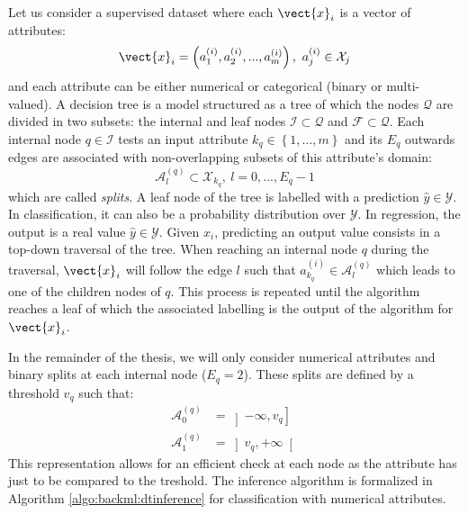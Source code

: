 Let us consider a supervised dataset where each $\vect{x}_i$ is a vector of
attributes:
\begin{equation}
\label{eqn:backml:dt:vectattributes}
\vect{x}_i = \left(a^{(i)}_1, a^{(i)}_2, ..., a^{(i)}_m\right),~a^{(i)}_j \in \mathcal{X}_j
\end{equation}
and each attribute can be either numerical or categorical (binary or multi-valued).
A decision tree is a model structured as a tree of which the nodes $\mathcal{Q}$
are divided in two subsets: the internal and leaf nodes $\mathcal{I} \subset \mathcal{Q}$
and $\mathcal{F} \subset \mathcal{Q}$. Each internal node $q \in \mathcal{I}$
tests an input attribute $k_q \in \left\{1,...,m\right\}$ and its $E_q$ outwards
edges are associated with non-overlapping subsets of this attribute's domain:
\begin{equation}
\label{eqn:backml:dt:splitsgeneric}
\mathcal{A}^{(q)}_l \subset \mathcal{X}_{k_q},~l = 0,...,E_q-1
\end{equation}
which are called \textit{splits}. A leaf node of the tree is labelled with
a prediction $\hat{y} \in \mathcal{Y}$. In classification, it can also be a probability distribution over $\mathcal{Y}$.
In regression, the output is a real value $\hat{y} \in \mathcal{Y}$. Given $x_i$,
predicting an output value consists in a top-down traversal of the tree. When
reaching an internal node $q$ during the traversal, $\vect{x}_i$ will follow the
edge $l$ such that $a^{(i)}_{k_q} \in \mathcal{A}^{(q)}_l$ which leads to one of
the children nodes of $q$. This process is repeated until the algorithm reaches
a leaf of which the associated labelling is the output of the algorithm for
$\vect{x}_i$.

In the remainder of the thesis, we will only consider numerical attributes and
binary splits at each internal node ($E_q = 2$). These splits are defined by a
threshold $v_q$ such that:
\begin{align}
\label{eqn:backml:dt:splitsbinary}
\mathcal{A}^{(q)}_0 &= \left]-\infty, v_q\right]\\
\mathcal{A}^{(q)}_1 &= \left]v_q, +\infty\right[
\end{align}
This representation allows for an efficient check at each node as the attribute
has just to be compared to the treshold. The inference algorithm is formalized in
Algorithm \ref{algo:backml:dtinference} for classification with numerical
attributes.

